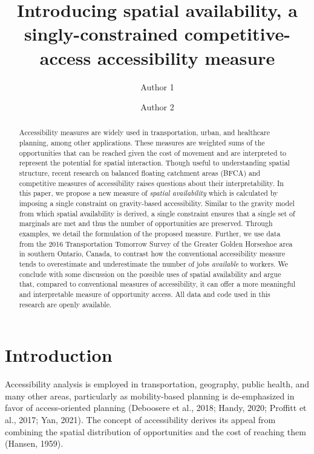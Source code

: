 \documentclass[]{elsarticle} %
\begin{document}
\begin{frontmatter}

  \title{Introducing spatial availability, a singly-constrained
competitive-access accessibility measure}
    \author[School]{Author 1}
    \author[School]{Author 2}
      \address[School]{Some School}
  
  \begin{abstract}
  Accessibility measures are widely used in transportation, urban, and
  healthcare planning, among other applications. These measures are
  weighted sums of the opportunities that can be reached given the cost
  of movement and are interpreted to represent the potential for spatial
  interaction. Though useful to understanding spatial structure, recent
  research on balanced floating catchment areas (BFCA) and competitive
  measures of accessibility raises questions about their
  interpretability. In this paper, we propose a new measure of
  \emph{spatial availability} which is calculated by imposing a single
  constraint on gravity-based accessibility. Similar to the gravity
  model from which spatial availability is derived, a single constraint
  ensures that a single set of marginals are met and thus the number of
  opportunities are preserved. Through examples, we detail the
  formulation of the proposed measure. Further, we use data from the
  2016 Transportation Tomorrow Survey of the Greater Golden Horseshoe
  area in southern Ontario, Canada, to contrast how the conventional
  accessibility measure tends to overestimate and underestimate the
  number of jobs \emph{available} to workers. We conclude with some
  discussion on the possible uses of spatial availability and argue
  that, compared to conventional measures of accessibility, it can offer
  a more meaningful and interpretable measure of opportunity access. All
  data and code used in this research are openly available.
  \end{abstract}
  
 \end{frontmatter}

\newpage

\hypertarget{introduction}{%
\section{Introduction}\label{introduction}}

Accessibility analysis is employed in transportation, geography, public
health, and many other areas, particularly as mobility-based planning is
de-emphasized in favor of access-oriented planning (Deboosere et al.,
2018; Handy, 2020; Proffitt et al., 2017; Yan, 2021). The concept of
accessibility derives its appeal from combining the spatial distribution
of opportunities and the cost of reaching them (Hansen, 1959).
\end{document}
